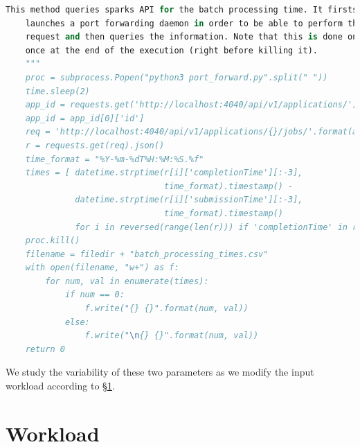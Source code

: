 \begin{enumerate}
\begin{lstlisting}[language=Python,caption={Snippet illustrating a query to Spark's REST API.},label=code:evaluation:requests]
    This method queries sparks API for the batch processing time. It firsts
    launches a port forwarding daemon in order to be able to perform the
    request and then queries the information. Note that this is done only
    once at the end of the execution (right before killing it).
    """
    proc = subprocess.Popen("python3 port_forward.py".split(" "))
    time.sleep(2)
    app_id = requests.get('http://localhost:4040/api/v1/applications/').json()
    app_id = app_id[0]['id']
    req = 'http://localhost:4040/api/v1/applications/{}/jobs/'.format(app_id)
    r = requests.get(req).json()
    time_format = "%Y-%m-%dT%H:%M:%S.%f"
    times = [ datetime.strptime(r[i]['completionTime'][:-3],
                                time_format).timestamp() -
              datetime.strptime(r[i]['submissionTime'][:-3],
                                time_format).timestamp()
              for i in reversed(range(len(r))) if 'completionTime' in r[i] ]
    proc.kill()
    filename = filedir + "batch_processing_times.csv"
    with open(filename, "w+") as f:
        for num, val in enumerate(times):
            if num == 0:
                f.write("{} {}".format(num, val))
            else:
                f.write("\n{} {}".format(num, val))
    return 0
\end{lstlisting}
\end{enumerate}
We study the variability of these two parameters as we modify the input workload according to \S\ref{sec:evaluation:workload}.

\section{Workload} \label{sec:evaluation:workload}

